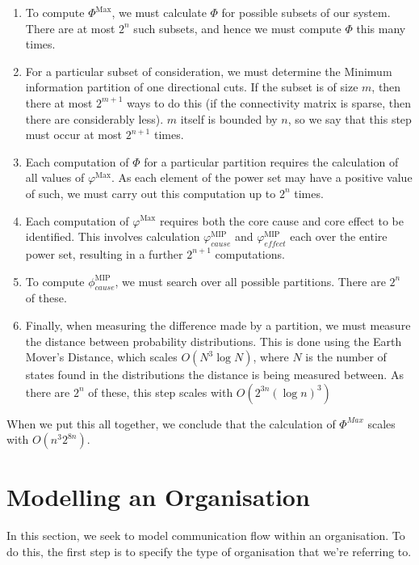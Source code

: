 \begin{enumerate}
	\item To compute $\Phi^{\text{Max}}$, we must calculate $\Phi$ for possible subsets of our system. There are at most $2^n$ such subsets, and hence we must compute $\Phi$ this many times.
	\item For a particular subset of consideration, we must determine the Minimum information partition of one directional cuts. If the subset is of size $m$, then there at most $2^{m+1}$ ways to do this (if the connectivity matrix is sparse, then there are considerably less). $m$ itself is bounded by $n$, so we say that this step must occur at most $2^{n+1}$ times.
	\item Each computation of $\Phi$ for a particular partition requires the calculation of all values of $\varphi^{\text{Max}}$. As each element of the power set may have a positive value of such, we must carry out this computation up to $2^n$ times.
	\item Each computation of $\varphi^{\text{Max}}$ requires both the core cause and core effect to be identified. This involves calculation $\varphi^{\text{MIP}}_{cause}$ and $\varphi^{\text{MIP}}_{effect}$ each over the entire power set, resulting in a further $2^{n+1}$ computations.  
	\item To compute $\phi_{cause}^{\text{MIP}}$, we must search over all possible partitions. There are $2^n$ of these.
	\item Finally, when measuring the difference made by a partition, we must measure the distance between probability distributions. This is done using the Earth Mover's Distance, which scales $O(N^3 \log N)$, where $N$ is the number of states found in the distributions the distance is being measured between. As there are $2^n$ of these, this step scales with $O(2^{3n} (\log n)^3)$
\end{enumerate}

When we put this all together, we conclude that the calculation of $\Phi^{Max}$ scales with $O(n^3 2^{8n})$.


\section{Modelling an Organisation}

In this section, we seek to model communication flow within an organisation. To do this, the first step is to specify the type of organisation that we're referring to. 

